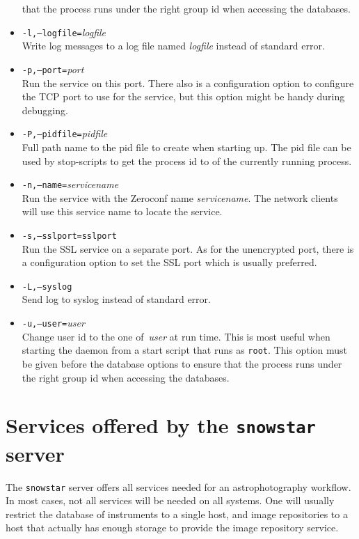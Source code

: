 \begin{itemize}
that the process runs under the right group id when accessing the
databases.
\item
\texttt{-l,--logfile=}\textit{logfile}
\\
Write log messages to a log file named \textit{logfile} instead of
standard error.
\item
\texttt{-p,--port=}\textit{port}
\\
Run the service on this port.
There also is a configuration option to configure the TCP port to use
for the service, but this option might be handy during debugging.
\item
\texttt{-P,--pidfile=}\textit{pidfile}
\\
Full path name to the pid file to create when starting up.
The pid file can be used by stop-scripts to get the process id
to of the currently running process.
\item
\texttt{-n,--name=}\textit{servicename}
\\
Run the service with the Zeroconf name \textit{servicename}.
The network clients will use this service name to locate the service.
\item
\texttt{-s,--sslport=}\texttt{sslport}
\\
Run the SSL service on a separate port.
As for the unencrypted port, there is a configuration option to set the
SSL port which is usually preferred.
\item
\texttt{-L,--syslog}
\\
Send log to syslog instead of standard error.
\item
\texttt{-u,--user=}\textit{user}
\\
Change user id to the one of~\textit{user} at run time.
This is most useful when starting the daemon from a start script
that runs as \texttt{root}.
This option must be given before the database options to ensure
that the process runs under the right group id when accessing the
databases.

\end{itemize}

\section{Services offered by the \texttt{snowstar} server}
The \texttt{snowstar} server offers all services needed for an
astrophotography workflow.
In most cases, not all services will be needed on all systems.
One will usually restrict the database of instruments to a single
host, and image repositories to a host that actually has enough
storage to provide the image repository service.

